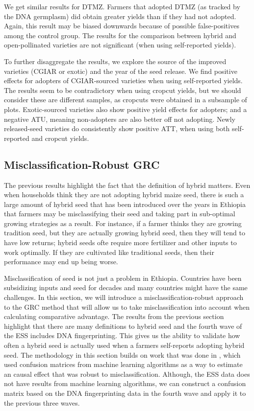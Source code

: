 \documentclass[11pt]{article}
\begin{document}
We get similar results for DTMZ. Farmers that adopted DTMZ (as tracked by the DNA germplasm) did obtain greater yields than if they had not adopted. Again, this result may be biased downwards because of possible false-positives among the control group. The results for the comparison between hybrid and open-pollinated varieties are not significant (when using self-reported yields).



To further disaggregate the results, we explore the source of the improved varieties (CGIAR or exotic) and the year of the seed release. We find positive effects for adopters of CGIAR-sourced varieties when using self-reported yields. The results seem to be contradictory when using cropcut yields, but we should consider these are different samples, as cropcuts were obtained in a subsample of plots. Exotic-sourced varieties also show positive yield effects for adopters; and a negative ATU, meaning non-adopters are also better off not adopting. Newly released-seed varieties do consistently show positive ATT, when using both self-reported and cropcut yields. 



\subsection{Misclassification-Robust GRC}

The previous results highlight the fact that the definition of hybrid matters. Even when households think they are not adopting hybrid maize seed, there is such a large amount of hybrid seed that has been introduced over the years in Ethiopia that farmers may be misclassifying their seed and taking part in sub-optimal growing strategies as a result. For instance, if a farmer thinks they are growing tradition seed, but they are actually growing hybrid seed, then they will tend to have low returns; hybrid seeds ofte require more fertilizer and other inputs to work optimally. If they are cultivated like traditional seeds, then their performance may end up being worse.

Misclassification of seed is not just a problem in Ethiopia. Countries have been subsidizing inputs and seed for decades and many countries might have the same challenges. In this section, we will introduce a misclassification-robust approach to the GRC method that will allow us to take misclassification into account when calculating comparative advantage. The results from the previous section highlight that there are many definitions to hybrid seed and the fourth wave of the ESS includes DNA fingerprinting. This gives us the ability to validate how often a hybrid seed is actually used when a farmers self-reports adopting hybrid seed. The methodology in this section builds on work that was done in \cite{michuda2021three}, which used confusion matrices from machine learning algorithms as a way to estimate an causal effect that was robust to misclassification. Although, the ESS data does not have results from machine learning algorithms, we can construct a confusion matrix based on the DNA fingerprinting data in the fourth wave and apply it to the previous three waves.
\end{document}
